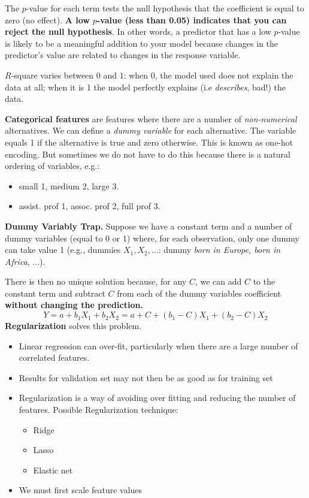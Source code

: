 The $p$-value for each term tests the null hypothesis that the coefficient is equal to zero (no effect). \textbf{A low }$p$\textbf{-value (less than 0.05) indicates that you can reject the null hypothesis}. In other words, a predictor that has a low $p$-value is likely to be a meaningful addition to your model because changes in the predictor's value are related to changes in the response variable.

$R$-square varies between 0 and 1: when 0, the model used does not explain the data at all; when it is 1 the model perfectly explains (i.e \textit{describes}, bad!) the data. 

\textbf{Categorical features} are features where there are a number of \textit{non-numerical} alternatives. We can define a \textit{dummy variable} for each alternative. The variable equals 1 if the alternative is true and zero otherwise. This is known as one-hot encoding. But sometimes we do not have to do this because there is a natural ordering of variables, e.g.:
\begin{itemize}
    \item small 1, medium 2, large 3.
    \item assist. prof 1, assoc. prof 2, full prof 3.
\end{itemize}

\textbf{Dummy Variably Trap.} Suppose we have a constant term and a number of dummy variables (equal to 0 or 1) where, for each observation, only one dummy can take value 1 (e.g., dummies $X_{1},X_{2},\dotsc $: dummy \textit{born in Europe, born in Africa}, ...).

There is then no unique solution because, for any $C$, we can add $C$ to the constant term and subtract $C$ from each of the dummy variables coefficient \textbf{without changing the prediction.}
\begin{equation*}
    Y = a+b_{1} X_{1} +b_{2} X_{2} =a+C+(b_{1} -C) X_{1} +(b_{2} -C) X_{2}
\end{equation*}
\textbf{Regularization} solves this problem.
\begin{itemize}
    \item Linear regression can over-fit, particularly when there are a large number of correlated features.
    \item Results for validation set may not then be as good as for training set
    \item Regularization is a way of avoiding over fitting and reducing the number of features. Possible Regularization technique:
    \begin{itemize}
        \item Ridge 
        \item Lasso
        \item Elastic net
    \end{itemize}
    \item We must first scale feature values
\end{itemize}

